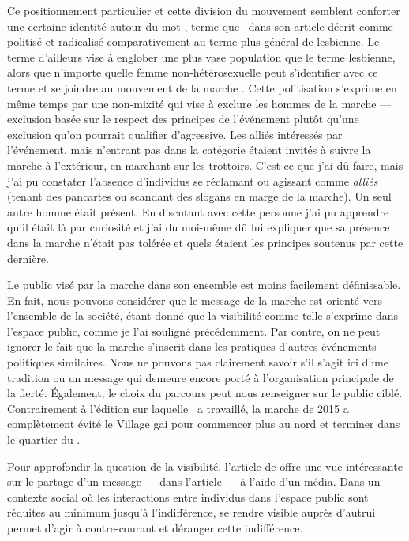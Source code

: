 Ce positionnement particulier et cette division du mouvement semblent conforter une certaine identité autour du mot \dyke{}, terme que~\citet{Podmore2015a} dans son article  décrit comme politisé et radicalisé comparativement au terme plus général de lesbienne. 
Le terme \dyke{} d'ailleurs vise à englober une plus vase population que le terme lesbienne, alors que n'importe quelle femme non-hétérosexuelle peut s'identifier avec ce terme et se joindre au mouvement de la marche \dyke{}. 
Cette politisation s'exprime en même temps par une non-mixité qui vise à exclure les hommes de la marche --- exclusion basée sur le respect des principes de l'événement plutôt qu'une exclusion qu'on pourrait qualifier d'agressive. 
Les alliés intéressés par l'événement, mais n'entrant pas dans la catégorie \dyke{} étaient invités à suivre la marche à l'extérieur, en marchant sur les trottoirs. 
C'est ce que j'ai dû faire, mais j'ai pu constater l'absence d'individus se réclamant ou agissant comme \emph{alliés} (tenant des pancartes ou scandant des slogans en marge de la marche). 
Un seul autre homme était présent. 
En discutant avec cette personne j'ai pu apprendre qu'il était là par curiosité et j'ai du moi-même dû lui expliquer que sa présence dans la marche n'était pas tolérée et quels étaient les principes soutenus par cette dernière.

Le public visé par la marche dans son ensemble est moins facilement définissable. 
En fait, nous pouvons considérer que le message de la marche est orienté vers l'ensemble de la société, étant donné que la visibilité comme telle s'exprime dans l'espace public, comme je l'ai souligné précédemment. 
Par contre, on ne peut ignorer le fait que la marche s'inscrit dans les pratiques d'autres événements politiques similaires. 
Nous ne pouvons pas clairement savoir s'il s'agit ici d'une tradition ou un message qui demeure encore porté à l'organisation principale de la fierté. 
Également, le choix du parcours peut nous renseigner sur le public ciblé. 
Contrairement à l'édition sur laquelle~\citet{Podmore2015a} a travaillé, la marche de 2015 a complètement évité le Village gai pour commencer plus au nord et terminer dans le quartier du .

Pour approfondir la question de la visibilité, l'article de \citet{Frosh2006}  offre une vue intéressante sur le partage d'un message ---  dans l'article --- à l'aide d'un média. 
Dans un contexte social où les interactions entre individus dans l'espace public sont réduites au minimum jusqu'à l'indifférence, se rendre visible auprès d'autrui permet d'agir à contre-courant et déranger cette indifférence.

